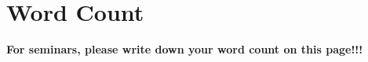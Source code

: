 \section*{Word Count}
\textbf{For seminars, please write down your word count on this page!!!}\\
\prettyresult                          %